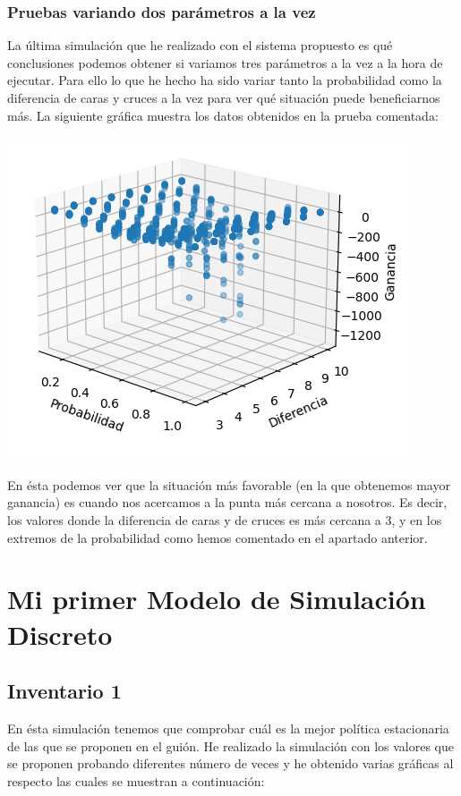 \documentclass[11pt,a4paper]{report}
\begin{document}
\subsection{Pruebas variando dos parámetros a la vez}

La última simulación que he realizado con el sistema propuesto es qué conclusiones podemos obtener si variamos tres parámetros a la vez a la hora de ejecutar. Para ello lo que he hecho ha sido variar tanto la probabilidad como la diferencia de caras y cruces a la vez para ver qué situación puede beneficiarnos más. La siguiente gráfica muestra los datos obtenidos en la prueba comentada:

\begin{center}
	\includegraphics[width=0.6\textheight]{img/Cap-1/3-ganancia-vs-prob-vs-diff.png}
\end{center}

En ésta podemos ver que la situación más favorable (en la que obtenemos mayor ganancia) es cuando nos acercamos a la punta más cercana a nosotros. Es decir, los valores donde la diferencia de caras y de cruces es más cercana a 3, y en los extremos de la probabilidad como hemos comentado en el apartado anterior.

\chapter{Mi primer Modelo de Simulación Discreto}
\newpage
\section{Inventario 1}
En ésta simulación tenemos que comprobar cuál es la mejor política estacionaria de las que se proponen en el guión. He realizado la simulación con los valores que se proponen probando diferentes número de veces y he obtenido varias gráficas al respecto las cuales se muestran a continuación:
\end{document}
